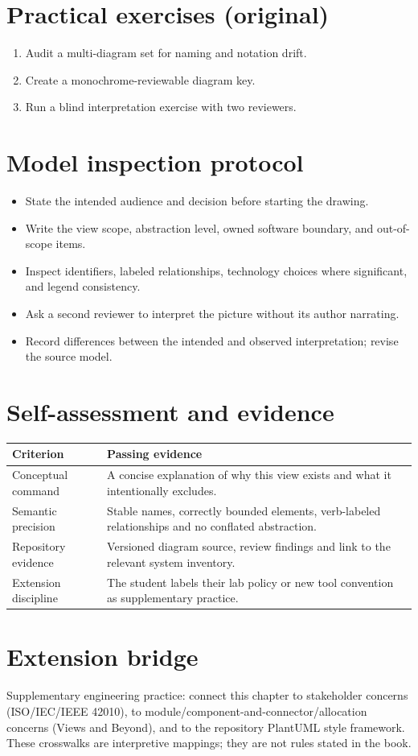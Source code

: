 \documentclass[10pt,letterpaper]{article}
\begin{document}
\section{Practical exercises (original)}
\begin{enumerate}
\item Audit a multi-diagram set for naming and notation drift.
\item Create a monochrome-reviewable diagram key.
\item Run a blind interpretation exercise with two reviewers.
\end{enumerate}

\section{Model inspection protocol}
\begin{itemize}
\item State the intended audience and decision before starting the drawing.
\item Write the view scope, abstraction level, owned software boundary, and out-of-scope items.
\item Inspect identifiers, labeled relationships, technology choices where significant, and legend consistency.
\item Ask a second reviewer to interpret the picture without its author narrating.
\item Record differences between the intended and observed interpretation; revise the source model.
\end{itemize}

\section{Self-assessment and evidence}
\begin{tabularx}{\linewidth}{@{}YY@{}}\toprule
\textbf{Criterion} & \textbf{Passing evidence} \\ \midrule
Conceptual command & A concise explanation of why this view exists and what it intentionally excludes. \\
Semantic precision & Stable names, correctly bounded elements, verb-labeled relationships and no conflated abstraction. \\
Repository evidence & Versioned diagram source, review findings and link to the relevant system inventory. \\
Extension discipline & The student labels their lab policy or new tool convention as supplementary practice. \\
\bottomrule\end{tabularx}


\section{Extension bridge}
Supplementary engineering practice: connect this chapter to stakeholder concerns (ISO/IEC/IEEE 42010), to module/component-and-connector/allocation concerns (Views and Beyond), and to the repository PlantUML style framework. These crosswalks are interpretive mappings; they are not rules stated in the book.
\end{document}
